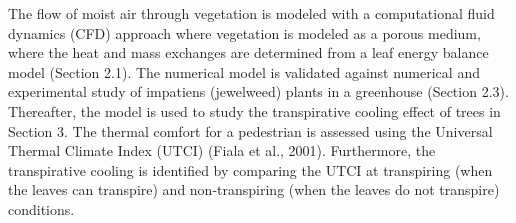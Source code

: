 The flow of moist air through vegetation is modeled with a computational fluid dynamics (CFD) approach where vegetation is modeled as a porous medium, where the heat and mass exchanges are determined from a leaf energy balance model (Section 2.1). The numerical model is validated against numerical and experimental study of impatiens (jewelweed) plants in a greenhouse (Section 2.3). Thereafter, the model is used to study the transpirative cooling effect of trees in Section 3. The thermal comfort for a pedestrian is assessed using the Universal Thermal Climate Index (UTCI) (Fiala et al., 2001). Furthermore, the transpirative cooling is identified by comparing the UTCI at transpiring (when the leaves can transpire) and non-transpiring (when the leaves do not transpire) conditions.


%
%
%
%
